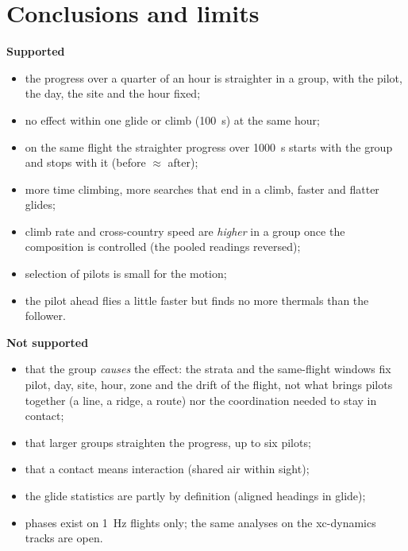 \documentclass[10pt,a4paper]{article}
\begin{document}
\section{Conclusions and limits}\label{sec:conclusions}

\begin{minipage}[t]{0.49\textwidth}
\textbf{Supported}
\begin{itemize}
  \item the progress over a quarter of an hour is straighter in a group, with the pilot, the day,
        the site and the hour fixed;
  \item no effect within one glide or climb (100~s) at the same hour;
  \item on the same flight the straighter progress over 1000~s starts with the group and stops with it (before $\approx$ after);
  \item more time climbing, more searches that end in a climb, faster and flatter glides;
  \item climb rate and cross-country speed are \emph{higher} in a group once the composition is
        controlled (the pooled readings reversed);
  \item selection of pilots is small for the motion;
  \item the pilot ahead flies a little faster but finds no more thermals than the follower.
\end{itemize}
\end{minipage}\hfill
\begin{minipage}[t]{0.49\textwidth}
\textbf{Not supported}
\begin{itemize}
  \item that the group \emph{causes} the effect: the strata and the same-flight windows fix pilot, day, site, hour,
        zone and the drift of the flight, not what brings pilots together (a line, a ridge, a route) nor the
        coordination needed to stay in contact;
  \item that larger groups straighten the progress, up to six pilots;
  \item that a contact means interaction (shared air within sight);
  \item the glide statistics are partly by definition (aligned headings in glide);
  \item phases exist on 1~Hz flights only; the same analyses on the xc-dynamics tracks are open.
\end{itemize}
\end{minipage}

\clearpage
\appendix

\end{document}
